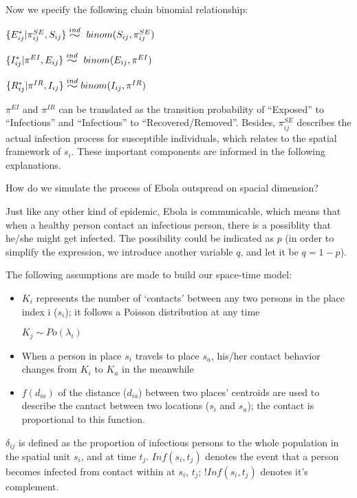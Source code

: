 \documentclass[11pt]{article}
\newcommand{\widesim}[2][1.5]{
      \mathrel{\overset{#2}{\scalebox{#1}[1]{$\sim$}}}
  }
\newcommand \mbreak {\\ \vspace{0.1in}}
\begin{document}
   Now we specify the following chain binomial relationship: 
    \vspace{0.15in}
    {

        
       { $\{E_{ij}^* | \pi^{SE}_{ij}, S_{ij} \} \widesim{ind}\ binom(S_{ij}, \pi^{SE}_{ij})$ }\mbreak

       { $\{I_{ij}^* | \pi^{EI}, E_{ij} \} \widesim{ind}\ binom(E_{ij}, \pi^{EI})$}\mbreak

       { $\{R_{ij}^* | \pi^{IR}, I_{ij} \} \widesim{ind} binom(I_{ij}, \pi^{IR})$}\mbreak
    }

$\pi^{EI}$ and $\pi^{IR}$ can be translated as the transition probability of ``Exposed'' to ``Infectious'' and ``Infectious'' to ``Recovered/Removed''. Besides, $\pi^{SE}_{ij}$ describes the actual infection process for susceptible individuals, which relates to the spatial framework of $ s_i $. These important components are informed in the following explanations.

How do we simulate the process of Ebola outspread on spacial dimension?

Just like any other kind of epidemic, Ebola is communicable, which means that when a healthy person contact an infectious person, there is a possiblity that he/she might get infected. The possibility could be indicated as $p$ (in order to simplify the expression, we introduce another variable $q$, and let it be $q=1-p$).

The following assumptions are made to build our space-time model:

\begin{itemize}

    \item $K_i$ represents the number of `contacts' between any two persons in the place index i ($s_i$); it follows a Poisson distribution at any time
    \begin{center}
        $K_j \sim Po(\lambda_i)$
    \end{center}
    \item When a person in place $s_i$ travels to place $s_a$, his/her contact behavior changes from $K_i$ to $K_a$ in the meanwhile 
    \item $f(d_{ia})$ of the distance ($d_{ia}$) between two places' centroids are used to describe the cantact between two locations ($s_i$ and $s_a$); the contact is proportional to this function.

\end{itemize}

$\delta_{ij}$ is defined as the proportion of infectious persons to the whole population in the spatial unit $s_i$, and at time $t_j$. $Inf(s_i, t_j)$ denotes the event that a person becomes 
infected from contact within at $s_i$, $t_j$; $!Inf(s_i, t_j)$ denotes it's complement.
\end{document}

